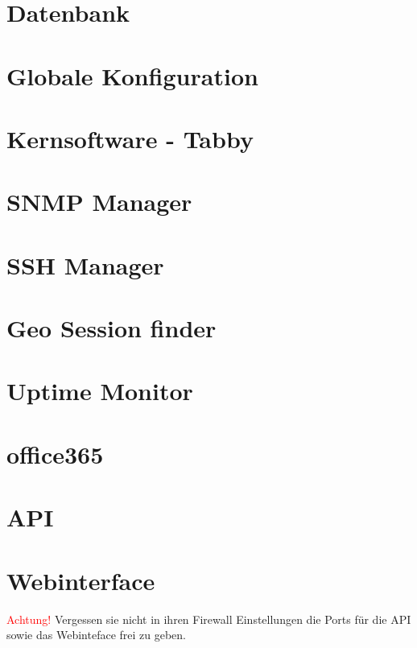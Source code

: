 \documentclass{article}
\begin{document}
	\section{Datenbank}
	
	\newpage
	
	\section{Globale Konfiguration}
	
	\newpage
	
	\section{Kernsoftware - Tabby}
	
	\newpage
	
	\section{SNMP Manager}
	
	\newpage
	
	\section{SSH Manager}
	
	\newpage
	
	\section{Geo Session finder}
	
	\newpage
	
	\section{Uptime Monitor}
	
	\newpage
	
	\section{office365}
	
	\newpage
	
	\section{API}
	
	\newpage
	
	\section{Webinterface}
	
	\newpage
	\textcolor{red}{Achtung!} Vergessen sie nicht in ihren Firewall Einstellungen die Ports für die API sowie das Webinteface frei zu geben.
\end{document}
